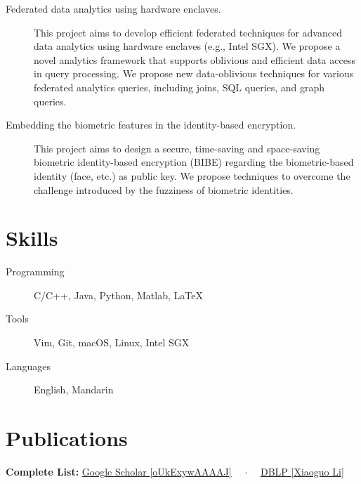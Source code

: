 \documentclass{mycv}
\begin{document}
\begin{description}
  \item[Federated data analytics using hardware enclaves.] This project aims to develop efficient federated techniques for advanced data analytics using hardware enclaves (e.g., Intel SGX). We propose a novel analytics framework that supports oblivious and efficient data access in query processing. We propose new data-oblivious techniques for various federated analytics queries, including joins, SQL queries, and graph queries.
  \item[Embedding the biometric features in the identity-based encryption.] This project aims to design a secure, time-saving and space-saving biometric identity-based encryption (BIBE) regarding the biometric-based identity (face, etc.) as public key. We propose techniques to overcome the challenge introduced by the fuzziness of biometric identities.
\end{description}

\section{Skills}

\begin{description}
  \item[Programming] C/C++, Java, Python, Matlab, \LaTeX
  \item[Tools] Vim, Git, macOS, Linux, Intel SGX
  \item[Languages] English, Mandarin
\end{description}

\section{Publications}%

\textbf{Complete List:}
\href{https://scholar.google.com/citations?user=oUkExywAAAAJ&hl=en}{Google Scholar \textsf{\footnotesize [oUkExywAAAAJ]}}%
{~~$\cdot$~~}%
\href{https://dblp.org/pid/176/6509.html}{DBLP \textsf{\footnotesize [Xiaoguo Li]}}%

\end{document}
